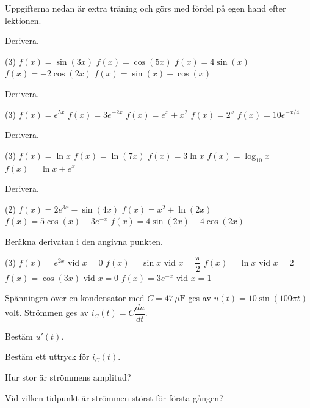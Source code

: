 Uppgifterna nedan är extra träning och görs med fördel på egen hand efter lektionen.

Derivera.
\begin{delar}(3)
  \task $f(x) = \sin(3x)$
  \task $f(x) = \cos(5x)$
  \task $f(x) = 4\sin(x)$
  \task $f(x) = -2\cos(2x)$
  \task $f(x) = \sin(x) + \cos(x)$
\end{delar}

Derivera.
\begin{delar}(3)
  \task $f(x) = e^{5x}$
  \task $f(x) = 3e^{-2x}$
  \task $f(x) = e^x + x^2$
  \task $f(x) = 2^x$
  \task $f(x) = 10e^{-x/4}$
\end{delar}

Derivera.
\begin{delar}(3)
  \task $f(x) = \ln x$
  \task $f(x) = \ln(7x)$
  \task $f(x) = 3\ln x$
  \task $f(x) = \log_{10} x$
  \task $f(x) = \ln x + e^x$
\end{delar}

Derivera.
\begin{delar}(2)
  \task $f(x) = 2e^{3x} - \sin(4x)$
  \task $f(x) = x^2 + \ln(2x)$
  \task $f(x) = 5\cos(x) - 3e^{-x}$
  \task $f(x) = 4\sin(2x) + 4\cos(2x)$
\end{delar}

Beräkna derivatan i den angivna punkten.
\begin{delar}(3)
  \task $f(x) = e^{2x}$ vid $x = 0$
  \task $f(x) = \sin x$ vid $x = \dfrac{\pi}{2}$
  \task $f(x) = \ln x$ vid $x = 2$
  \task $f(x) = \cos(3x)$ vid $x = 0$
  \task $f(x) = 3e^{-x}$ vid $x = 1$
\end{delar}

Spänningen över en kondensator med $C = 47\,\mu\text{F}$ ges av $u(t) = 10\sin(100\pi t)$ volt.
Strömmen ges av $i_C(t) = C\dfrac{du}{dt}$.
\begin{parts}
  \item Bestäm $u'(t)$.
  \item Bestäm ett uttryck för $i_C(t)$.
  \item Hur stor är strömmens amplitud?
  \item Vid vilken tidpunkt är strömmen störst för första gången?
\end{parts}

